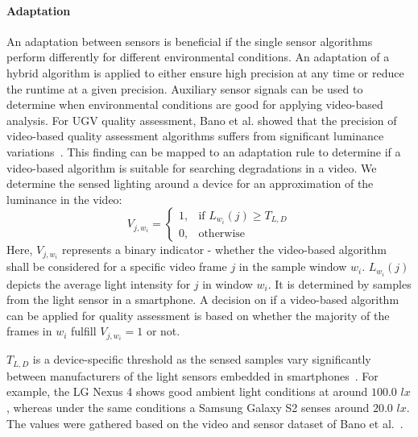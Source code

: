 \paragraph{Adaptation}
\label{sec:554_Adaptation}
An adaptation between sensors is beneficial if the single sensor algorithms perform differently for different environmental conditions.
An adaptation of a hybrid algorithm is applied to either ensure high precision at any time or reduce the runtime at a given precision.
Auxiliary sensor signals can be used to determine when environmental conditions are good for applying video-based analysis.
For \ac{UGV} quality assessment, Bano et al. showed that the precision of video-based quality assessment algorithms suffers from significant luminance variations~\cite{Bano2015}.
This finding can be mapped to an adaptation rule to determine if a video-based algorithm is suitable for searching degradations in a video.
We determine the sensed lighting around a device for an approximation of the luminance in the video:
\begin{equation}
\label{eq:554_luma_threshold}
V_{j,w_i} = \begin{cases}
1,& \text{if } L_{w_i}(j) \geq T_{L,D}\\
0,& \text{otherwise}
\end{cases}
\end{equation}
Here, $V_{j,w_i}$ represents a binary indicator - whether the video-based algorithm shall be considered for a specific video frame $j$ in the sample window $w_i$.
$L_{w_i}(j)$ depicts the average light intensity for $j$ in window $w_i$.
It is determined by samples from the light sensor in a smartphone. 
A decision on if a video-based algorithm can be applied for quality assessment is based on whether the majority of the frames in $w_i$ fulfill $V_{j,w_i} = 1$ or not. 

$T_{L,D}$ is a device-specific threshold as the sensed samples vary significantly between manufacturers of the light sensors embedded in smartphones~\cite{Bano2015}.
For example, the LG Nexus 4 shows good ambient light conditions at around $100.0$ $ \unit{lx}$, whereas under the same conditions a Samsung Galaxy S2 senses around $20.0$ $\unit{lx}$.
The values were gathered based on the video and sensor dataset of Bano et al.~\cite{Bano2015}.

